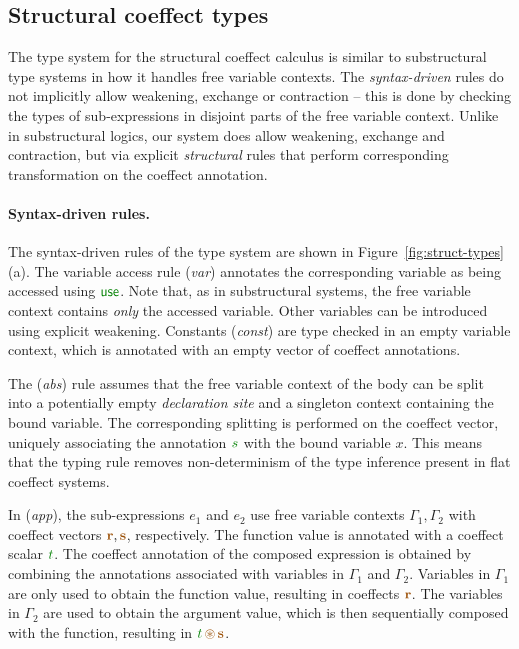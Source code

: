 
\subsection{Structural coeffect types}
\label{sec:struct-calculus-types}

The type system for the structural coeffect calculus is similar to substructural type systems
in how it handles free variable contexts. The \emph{syntax-driven} rules do not implicitly allow
weakening, exchange or contraction -- this is done by checking the types of sub-expressions
in disjoint parts of the free variable context. Unlike in substructural logics, our system
does allow weakening, exchange and contraction, but via explicit \emph{structural} rules that
perform corresponding transformation on the coeffect annotation.

\paragraph{Syntax-driven rules.}
The syntax-driven rules of the type system are shown in Figure~\ref{fig:struct-types} (a).
The variable access rule (\emph{var}) annotates the corresponding variable as being accessed
using $\cunit$. Note that, as in substructural systems, the free variable context contains
\emph{only} the accessed variable. Other variables can be introduced using explicit weakening.
Constants (\emph{const}) are type checked in an empty variable context, which is annotated with
an empty vector of coeffect annotations.

The (\emph{abs}) rule assumes that the free variable context of the body can be split into
a potentially empty \emph{declaration site} and a singleton context containing the bound
variable. The corresponding splitting is performed on the coeffect vector, uniquely associating
the annotation $\cclrd{s}$ with the bound variable $x$. This means that the typing rule removes
non-determinism of the type inference present in flat coeffect systems.

In (\emph{app}), the sub-expressions $e_1$ and $e_2$ use free variable contexts $\Gamma_1, \Gamma_2$
with coeffect vectors $\aclrd{\textbf{r}}, \aclrd{\textbf{s}}$, respectively. The function
value is annotated with a coeffect scalar $\cclrd{t}$.
The coeffect annotation of the composed expression is obtained by combining the annotations
associated with variables in $\Gamma_1$ and $\Gamma_2$. Variables in $\Gamma_1$ are only
used to obtain the function value, resulting in coeffects $\aclrd{\textbf{r}}$. The
variables in $\Gamma_2$ are used to obtain the argument value, which is then sequentially
composed with the function, resulting in $\cclrd{t}\,\aseq\,\aclrd{\textbf{s}}$.

